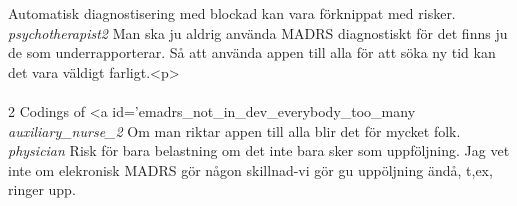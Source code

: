 \documentclass[12pt,a4paper,oneside]{article}
\begin{document}
Automatisk diagnostisering med blockad kan vara förknippat med risker. %
 {\it psychotherapist2 %
 } 
Man ska ju aldrig använda MADRS diagnostiskt för det finns ju de som underrapporterar. Så att använda appen till alla för att söka ny tid kan det vara väldigt farligt.<p> %
\\
\\
2 Codings of <a id='emadrs\_not\_in\_dev\_everybody\_too\_many %
 {\it auxiliary\_nurse\_2 %
 } 
Om man riktar appen till alla blir det för mycket folk. %
 {\it physician %
 } 
Risk för bara belastning om det inte bara sker som uppföljning. Jag vet inte om elekronisk MADRS gör någon skillnad-vi gör gu uppöljning ändå, t,ex, ringer upp. %
\end{document}
